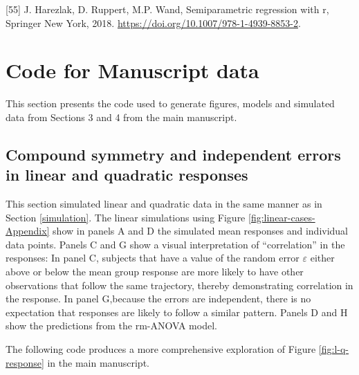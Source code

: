 \documentclass[
]{article}
\begin{document}
\leavevmode\hypertarget{ref-harezlak2018}{}%
{[}55{]} J. Harezlak, D. Ruppert, M.P. Wand, Semiparametric regression with r, Springer New York, 2018. \url{https://doi.org/10.1007/978-1-4939-8853-2}.

\hypertarget{appendix-appendix}{%
\appendix}


\hypertarget{code-for-manuscript-data}{%
\section{Code for Manuscript data}\label{code-for-manuscript-data}}

This section presents the code used to generate figures, models and simulated data from Sections 3 and 4 from the main manuscript.

\hypertarget{compound-symmetry-and-independent-errors-in-linear-and-quadratic-responses}{%
\subsection{Compound symmetry and independent errors in linear and quadratic responses}\label{compound-symmetry-and-independent-errors-in-linear-and-quadratic-responses}}

This section simulated linear and quadratic data in the same manner as in Section \ref{simulation}. The linear simulations using Figure \ref{fig:linear-cases-Appendix} show in panels A and D the simulated mean responses and individual data points. Panels C and G show a visual interpretation of ``correlation'' in the responses: In panel C, subjects that have a value of the random error \(\varepsilon\) either above or below the mean group response are more likely to have other observations that follow the same trajectory, thereby demonstrating correlation in the response. In panel G,because the errors are independent, there is no expectation that responses are likely to follow a similar pattern. Panels D and H show the predictions from the rm-ANOVA model.

The following code produces a more comprehensive exploration of Figure \ref{fig:l-q-response} in the main manuscript.
\end{document}

